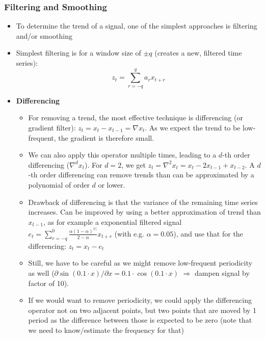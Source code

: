 \subsubsection{Filtering and Smoothing}
\begin{itemize}
	\item To determine the trend of a signal, one of the simplest approaches is filtering and/or smoothing
	\item Simplest filtering is for a window size of $\pm q$ (creates a new, filtered time series):
	$$z_t = \sum\limits_{r=-q}^{q} a_r x_{t+r}$$
	\item \textbf{Differencing}
	\begin{itemize}
		\item For removing a trend, the most effective technique is differencing (or gradient filter): $z_t = x_t - x_{t-1} = \nabla x_t$. As we expect the trend to be low-frequent, the gradient is therefore small. %
		\item We can also apply this operator multiple times, leading to a $d$-th order differencing ($\nabla^d x_t$). For $d=2$, we get $z_t = \nabla^2 x_t = x_t - 2x_{t-1}+x_{t-2}$. A $d$-th order differencing can remove trends than can be approximated by a polynomial of order $d$ or lower.
		\item Drawback of differencing is that the variance of the remaining time series increases. Can be improved by using a better approximation of trend than $x_{t-1}$, as for example a exponential filtered signal $e_{t} = \sum\limits_{r=-q}^{0} \frac{\alpha(1 - \alpha)^{|r|}}{2 - \alpha} x_{t+r}$ (with e.g. $\alpha=0.05$), and use that for the differencing: $z_t = x_t - e_{t}$
		\item Still, we have to be careful as we might remove low-frequent periodicity as well ($\partial \sin(0.1\cdot x)/\partial x = 0.1 \cdot \cos(0.1 \cdot x)$ $\Rightarrow$ dampen signal by factor of 10). 
		\item If we would want to remove periodicity, we could apply the differencing operator not on two adjacent points, but two points that are moved by 1 period as the difference between those is expected to be zero (note that we need to know/estimate the frequency for that)
	\end{itemize}
\end{itemize}
